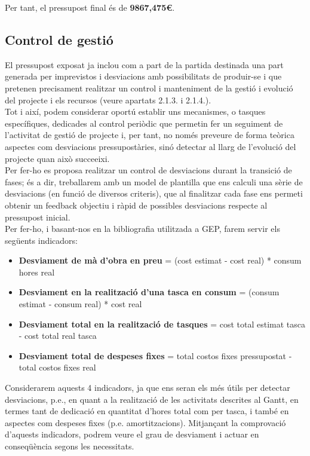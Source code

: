 Per tant, el pressupost final és de \textbf{9867,475\euro}.

\subsection{Control de gestió}

El pressupost exposat ja inclou com a part de la partida destinada una part generada per imprevistos i desviacions amb possibilitats de produir-se i que pretenen precisament realitzar un control i manteniment de la gestió i evolució del projecte i els recursos (veure apartats 2.1.3. i 2.1.4.).\\

Tot i així, podem considerar oportú establir uns mecanismes, o tasques específiques, dedicades al control periòdic que permetin fer un seguiment de l’activitat de gestió de projecte i, per tant, no només preveure de forma teòrica aspectes com desviacions pressupostàries, sinó detectar al llarg de l’evolució del projecte quan això succeeixi.\\

Per fer-ho es proposa realitzar un control de desviacions durant la transició de fases; és a dir, treballarem amb un model de plantilla que ens calculi una sèrie de desviacions (en funció de diversos criteris), que al finalitzar cada fase ens permeti obtenir un feedback objectiu i ràpid de possibles desviacions respecte al pressupost inicial.\\

Per fer-ho, i basant-nos en la bibliografia utilitzada a GEP, farem servir els següents indicadors:

\begin{itemize}
\item \textbf{Desviament de mà d’obra en preu} = (cost estimat - cost real) * consum hores real
\item \textbf{Desviament en la realització d’una tasca en consum} = (consum estimat - consum real) * cost real
\item \textbf{Desviament total en la realització de tasques} = cost total estimat tasca - cost total real tasca
\item \textbf{Desviament total de despeses fixes} = total costos fixes pressupostat - total costos fixes real
\end{itemize}

Considerarem aquests 4 indicadors, ja que ens seran els més útils per detectar desviacions, p.e., en quant a la realització de les activitats descrites al Gantt, en termes tant de dedicació en quantitat d’hores total com per tasca, i també en aspectes com despeses fixes (p.e. amortitzacions). Mitjançant la comprovació d’aquests indicadors, podrem veure el grau de desviament i actuar en conseqüència segons les necessitats. 

